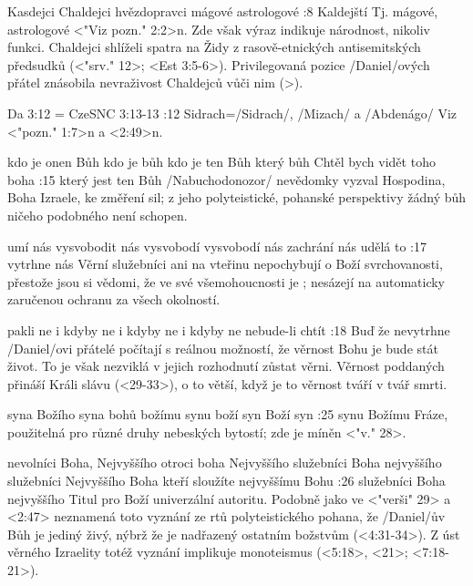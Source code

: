     {Kasdejci} %
    {Chaldejci}  %
    {hvězdopravci} %
    {mágové}  %
    {astrologové}  %
:8 {Kaldejští} Tj. mágové, astrologové <"Viz pozn." 2:2>n.  %
 Zde však výraz  indikuje národnost, nikoliv funkci. Chaldejci shlíželi spatra na Židy z rasově-etnických antisemitských předsudků (<"srv." 12>; <Est 3:5-6>). 
 Privilegovaná pozice \x/Daniel/ových přátel znásobila nevraživost Chaldejců vůči nim (>).

\renum Da 3:12 = CzeSNC 3:13-13
:12 {Sidrach}={\x/Sidrach/, \x/Mizach/ a \x/Abdenágo/} Viz <"pozn." 1:7>n a <2:49>n. 

    {kdo je onen Bůh} %
    {kdo je bůh}  %
    {kdo je ten Bůh} %
    {který bůh}  %
    {Chtěl bych vidět toho boha}  %
:15 {který jest ten Bůh} \x/Nabuchodonozor/ nevědomky vyzval Hospodina, Boha Izraele, ke změření sil; z jeho polyteistické, pohanské perspektivy žádný bůh ničeho podobného není schopen.


    {umí nás vysvobodit} %
    {nás vysvobodí}  %
    {vysvobodí nás} %
    {zachrání nás}  %
    {udělá to}  %
:17  {vytrhne nás} Věrní služebníci ani na vteřinu nepochybují o Boží svrchovanosti, přestože jsou si vědomi, že ve své všemohoucnosti je ; nesázejí na automaticky zaručenou ochranu za všech okolností. 

    {pakli ne} %
    {i kdyby ne}  %
    {i kdyby ne} %
    {i kdyby ne}  %
    {nebude-li chtít}  %
:18 {Buď že nevytrhne} \x/Daniel/ovi přátelé počítají s reálnou možností, že věrnost Bohu je bude stát život. To je však nezviklá v jejich rozhodnutí zůstat věrni. Věrnost poddaných přináší Králi slávu (<29-33>), o to větší, když je to věrnost tváří v tvář smrti.

    {syna Božího} %
    {syna bohů}  %
    {božímu synu} %
    {boží syn}  %
    {Boží syn}  %
:25 {synu Božímu} Fráze, použitelná pro různé druhy nebeských bytostí; zde je míněn  <"v." 28>.

    {nevolníci Boha, Nejvyššího} %
    {otroci boha Nejvyššího}  %
    {služebníci Boha nejvyššího} %
    {služebníci Nejvyššího Boha}  %
    {kteří sloužíte nejvyššímu Bohu}  %
:26 {služebníci Boha nejvyššího} Titul pro Boží univerzální autoritu. Podobně jako ve
        <"verši" 29> a <2:47> neznamená toto vyznání ze rtů polyteistického pohana, 
        že \x/Daniel/ův Bůh je jediný živý, nýbrž že je nadřazený ostatním božstvům (<4:31-34>).
        Z úst věrného Izraelity totéž vyznání implikuje monoteismus (<5:18>, <21>; <7:18-21>).

